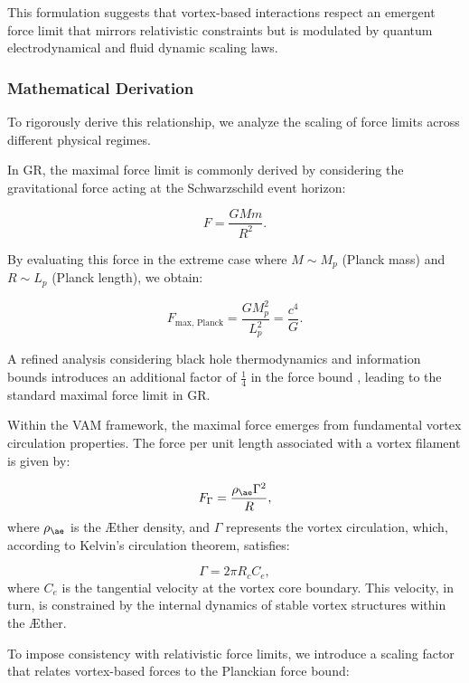 This formulation suggests that vortex-based interactions respect an emergent force limit that mirrors relativistic constraints but is modulated by quantum electrodynamical and fluid dynamic scaling laws.


\subsubsection*{Mathematical Derivation}
To rigorously derive this relationship, we analyze the scaling of force limits across different physical regimes.


In GR, the maximal force limit is commonly derived by considering the gravitational force acting at the Schwarzschild event horizon:


\begin{equation}
F = \frac{GMm}{R^2}.
\end{equation}


By evaluating this force in the extreme case where $M \sim M_p$ (Planck mass) and $R \sim L_p$ (Planck length), we obtain:


\begin{equation}
F_{\text{max, Planck}} = \frac{G M_p^2}{L_p^2} = \frac{c^4}{G}.
\end{equation}


A refined analysis considering black hole thermodynamics and information bounds introduces an additional factor of $\frac{1}{4}$ in the force bound \cite{Gibbons2002}, leading to the standard maximal force limit in GR.


Within the VAM framework, the maximal force emerges from fundamental vortex circulation properties. The force per unit length associated with a vortex filament is given by:


\begin{equation}
F_{\Gamma} = \frac{\rho_{\ae} \Gamma^2}{R},
\end{equation}
where $\rho_{\ae}$ is the \AE ther density, and $\Gamma$ represents the vortex circulation, which, according to Kelvin’s circulation theorem, satisfies:


\begin{equation}
\Gamma = 2\pi R_c C_e,
\end{equation}
where $C_e$ is the tangential velocity at the vortex core boundary. This velocity, in turn, is constrained by the internal dynamics of stable vortex structures within the \AE ther.


To impose consistency with relativistic force limits, we introduce a scaling factor that relates vortex-based forces to the Planckian force bound:


